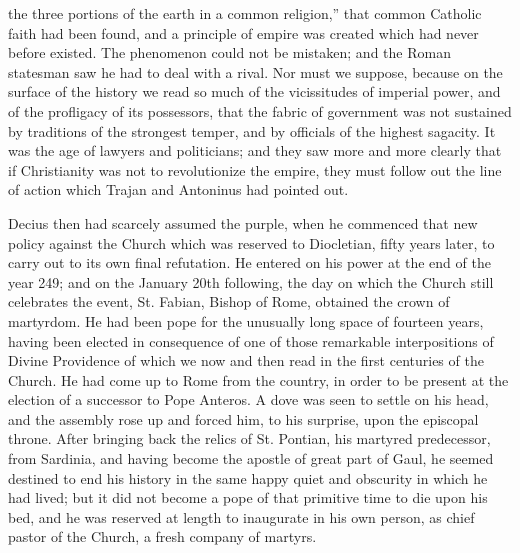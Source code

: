 the three portions of the earth in a common religion,'' that
common Catholic faith had been found, and a principle of empire was
created which had never before existed. The phenomenon could not be
mistaken; and the Roman statesman saw he had to deal with a rival. Nor
must we suppose, because on the surface of the history we read so much
of the vicissitudes of imperial power, and of the profligacy of its
possessors, that the fabric of government was not sustained by
traditions of the strongest temper, and by officials of the highest
sagacity. It was the age of lawyers and politicians; and they saw more
and more clearly that if Christianity was not to revolutionize the
empire, they must follow out the line of action which Trajan and
Antoninus had pointed out.

Decius then had scarcely assumed the purple, when he commenced that
new policy against the Church which was reserved to Diocletian, fifty
years later, to carry out to its own final refutation. He entered on
his power at the end of the year 249; and on the January 20th
following, the day on which the Church still celebrates the event, St.
Fabian, Bishop of Rome, obtained the crown of martyrdom. He had
been pope for the unusually long space of fourteen years, having been
elected in consequence of one of those remarkable interpositions of
Divine Providence of which we now and then read in the first centuries
of the Church. He had come up to Rome from the country, in order to be
present at the election of a successor to Pope Anteros. A dove was
seen to settle on his head, and the assembly rose up and forced him,
to his surprise, upon the episcopal throne. After bringing back the
relics of St. Pontian, his martyred predecessor, from Sardinia, and
having become the apostle of great part of Gaul, he seemed destined to
end his history in the same happy quiet and obscurity in which he had
lived; but it did not become a pope of that primitive time to die upon
his bed, and he was reserved at length to inaugurate in his own
person, as chief pastor of the Church, a fresh company of martyrs.

